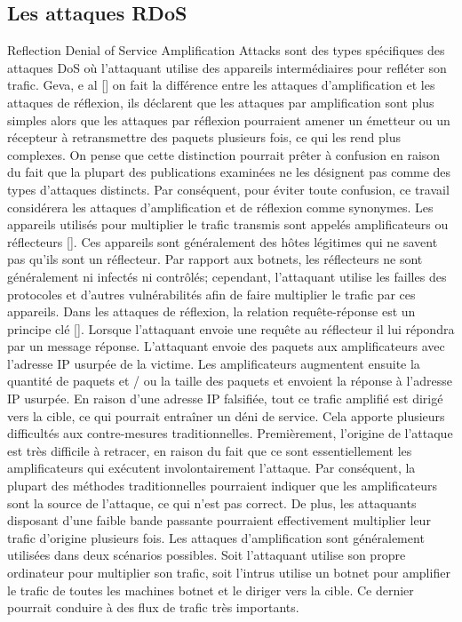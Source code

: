 \subsection{Les attaques RDoS}
\label{rDoS}
Reflection Denial of Service Amplification Attacks sont des types spécifiques des attaques DoS où l'attaquant utilise des appareils intermédiaires pour refléter son trafic. Geva, e al [\cite{8}] on fait la différence entre les attaques d'amplification et les attaques de réflexion, ils déclarent que les attaques par amplification sont plus simples alors que les attaques par réflexion pourraient amener un émetteur ou un récepteur à retransmettre des paquets plusieurs fois, ce qui les rend plus complexes. On pense que cette distinction pourrait prêter à confusion en raison du fait que la plupart des publications examinées ne les désignent pas comme des types d'attaques distincts. Par conséquent, pour éviter toute confusion, ce travail considérera les attaques d'amplification et de réflexion comme synonymes. Les appareils utilisés pour multiplier le trafic transmis sont appelés amplificateurs ou réflecteurs [\cite{9}]. Ces appareils sont généralement des hôtes légitimes qui ne savent pas qu'ils sont un réflecteur. Par rapport aux botnets, les réflecteurs ne sont généralement ni infectés ni contrôlés; cependant, l'attaquant utilise les failles des protocoles et d'autres vulnérabilités afin de faire multiplier le trafic par ces appareils. Dans les attaques de réflexion, la relation requête-réponse est un principe clé [\cite{10}]. Lorsque l'attaquant envoie une requête au réflecteur il lui répondra par un message réponse. L'attaquant envoie des paquets aux amplificateurs avec l'adresse IP usurpée de la victime. Les amplificateurs augmentent ensuite la quantité de paquets et / ou la taille des paquets et envoient la réponse à l'adresse IP usurpée. En raison d'une adresse IP falsifiée, tout ce trafic amplifié est dirigé vers la cible, ce qui pourrait entraîner un déni de service. Cela apporte plusieurs difficultés aux contre-mesures traditionnelles. Premièrement, l'origine de l'attaque est très difficile à retracer, en raison du fait que ce sont essentiellement les amplificateurs qui exécutent involontairement l'attaque. Par conséquent, la plupart des méthodes traditionnelles pourraient indiquer que les amplificateurs sont la source de l'attaque, ce qui n'est pas correct. De plus, les attaquants disposant d'une faible bande passante pourraient effectivement multiplier leur trafic d'origine plusieurs fois. Les attaques d'amplification sont généralement utilisées dans deux scénarios possibles. Soit l'attaquant utilise son propre ordinateur pour multiplier son trafic, soit l'intrus utilise un botnet pour amplifier le trafic de toutes les machines botnet et le diriger vers la cible. Ce dernier pourrait conduire à des flux de trafic très importants.

